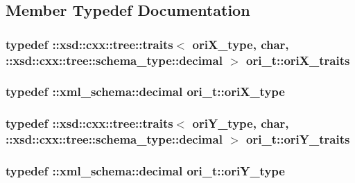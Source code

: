 \subsection{Member Typedef Documentation}
\hypertarget{classori__t_a41d83d718921a993be9cef2cbc9b4df2}{
\subsubsection[{ori\-X\-\_\-traits}]{\setlength{\rightskip}{0pt plus 5cm}typedef \-::xsd\-::cxx\-::tree\-::traits$<$ {\bf ori\-X\-\_\-type}, char, \-::xsd\-::cxx\-::tree\-::schema\-\_\-type\-::decimal $>$ {\bf ori\-\_\-t\-::ori\-X\-\_\-traits}}}\label{classori__t_a41d83d718921a993be9cef2cbc9b4df2}
\hypertarget{classori__t_a0d346be84e44760fbb97262b96c52110}{
\subsubsection[{ori\-X\-\_\-type}]{\setlength{\rightskip}{0pt plus 5cm}typedef \-::{\bf xml\-\_\-schema\-::decimal} {\bf ori\-\_\-t\-::ori\-X\-\_\-type}}}\label{classori__t_a0d346be84e44760fbb97262b96c52110}
\hypertarget{classori__t_a48bd94e6aadcf83768ddc7cf92ce5ce2}{
\subsubsection[{ori\-Y\-\_\-traits}]{\setlength{\rightskip}{0pt plus 5cm}typedef \-::xsd\-::cxx\-::tree\-::traits$<$ {\bf ori\-Y\-\_\-type}, char, \-::xsd\-::cxx\-::tree\-::schema\-\_\-type\-::decimal $>$ {\bf ori\-\_\-t\-::ori\-Y\-\_\-traits}}}\label{classori__t_a48bd94e6aadcf83768ddc7cf92ce5ce2}
\hypertarget{classori__t_ad04f9558bf4506128686a25e23817966}{
\subsubsection[{ori\-Y\-\_\-type}]{\setlength{\rightskip}{0pt plus 5cm}typedef \-::{\bf xml\-\_\-schema\-::decimal} {\bf ori\-\_\-t\-::ori\-Y\-\_\-type}}}\label{classori__t_ad04f9558bf4506128686a25e23817966}
